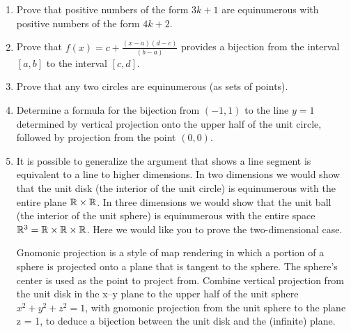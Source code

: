 \begin{enumerate}
\item  Prove that positive numbers of the form $3k +1$ are equinumerous with
positive numbers of the form $4k + 2$.

\wbvfill

\item Prove that $\displaystyle f(x) =  c + \frac{(x-a)(d-c)}{(b-a)}$ 
provides a bijection from the interval $[a, b]$ to the interval $[c, d]$.

\wbvfill

\workbookpagebreak

\item Prove that any two circles are equinumerous (as sets of points).

\wbvfill

\item Determine a formula for the bijection from $(-1, 1)$ to the line $y = 1$
determined by vertical projection onto the upper half of the unit circle,
followed by projection from the point $(0, 0)$.

\wbvfill

\workbookpagebreak

\item  It is possible to generalize the argument that shows a line segment is
equivalent to a line to higher dimensions.   In two dimensions we would
show that the unit disk (the interior of the unit circle) is equinumerous
with the entire plane ${\mathbb R} \times {\mathbb R}$.   In three dimensions we would show that
the unit ball (the interior of the unit sphere) is equinumerous with the
entire space ${\mathbb R}^3 = {\mathbb R} \times {\mathbb R} \times {\mathbb R}$.  Here we 
would like you to prove the two-dimensional case.

Gnomonic projection is a style of map rendering in which a portion of a
sphere is projected onto a plane that is tangent to the sphere.  The 
sphere's center is used as the point to project from.  Combine 
vertical projection from the unit disk
in the x--y plane to the upper half of the unit sphere $x^2 + y^2 + z^2 = 1$,
with gnomonic projection from the unit sphere to the plane z = 1, to
deduce a bijection between the unit disk and the (infinite) plane.

\wbvfill

\end{enumerate}
 

